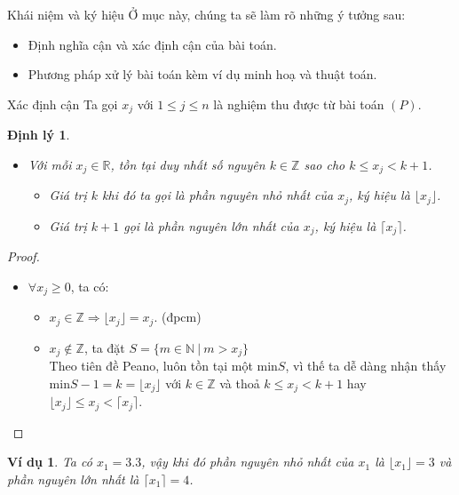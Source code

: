 \documentclass{beamer}
\newtheorem{dl}{Định lý}[section]
\newtheorem{vd}{Ví dụ}[section]
\begin{document}
\begin{frame}{Khái niệm và ký hiệu}
\large
Ở mục này, chúng ta sẽ làm rõ những ý tưởng sau:
\begin{itemize}
\item Định nghĩa cận và xác định cận của bài toán.
\item Phương pháp xử lý bài toán kèm ví dụ minh hoạ và thuật toán.
\end{itemize}
\end{frame}
   
\begin{frame}{Xác định cận}
Ta gọi $x_j$ với $1 \leq j \leq n$ là nghiệm thu được từ bài toán $(P)$.
\begin{dl}\label{cmnguyen}
\begin{itemize}
\item Với mỗi $x_j \in \mathbb{R}$, tồn tại duy nhất số nguyên $k \in \mathbb{Z}$ sao cho $k \leq x_j < k+1$.
\begin{itemize}
\item Giá trị $k$ khi đó ta gọi là phần nguyên nhỏ nhất của $x_j$, ký hiệu là $\lfloor x_j \rfloor$.
\item Giá trị $k+1$ gọi là phần nguyên lớn nhất của $x_j$, ký hiệu là $\lceil x_j \rceil$.
\end{itemize}
\end{itemize}
\end{dl}
\end{frame}

\begin{frame}
\begin{proof}
\begin{itemize}
\item $\forall x_j \geq 0$, ta có:
\begin{itemize}
\item $x_j \in \mathbb{Z} \Rightarrow \lfloor x_j \rfloor =x_j$. (đpcm)
\item $x_j \notin \mathbb{Z}$, ta đặt $S=\{ m \in \mathbb{N} \: \vert \: m > x_j \}$ \\ Theo tiên đề Peano, luôn tồn tại một min$S$, vì thế ta dễ dàng nhận thấy min$S -1=k=\lfloor x_j \rfloor$ với $k \in \mathbb{Z}$ và thoả $k \leq x_j < k+1$ hay $\lfloor x_j \rfloor \leq x_j <\lceil x_j \rceil$. 
\end{itemize}
\end{itemize}
\end{proof}

\begin{vd}
Ta có $x_1=3.3$, vậy khi đó phần nguyên nhỏ nhất của $x_1$ là $\lfloor x_1 \rfloor = 3$ và phần nguyên lớn nhất là $\lceil x_1 \rceil =4$.
\end{vd}
\end{frame}
\end{document}
